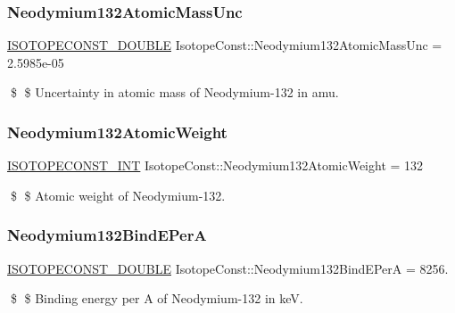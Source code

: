 \subsubsection{\texorpdfstring{Neodymium132\+Atomic\+Mass\+Unc}{Neodymium132AtomicMassUnc}}
{\footnotesize\ttfamily \mbox{\hyperlink{group___isotope_const-_macros_ga8f45a7272ce02c0b4c65c44636ed719a}{I\+S\+O\+T\+O\+P\+E\+C\+O\+N\+S\+T\+\_\+\+D\+O\+U\+B\+LE}} Isotope\+Const\+::\+Neodymium132\+Atomic\+Mass\+Unc = 2.\+5985e-\/05}

\$ \$ Uncertainty in atomic mass of Neodymium-\/132 in amu. \mbox{\label{group___isotope_const-_neodymium-_nd132_ga2d6ca3d63b9e0194f2586f181ee27cfa}} 
\subsubsection{\texorpdfstring{Neodymium132\+Atomic\+Weight}{Neodymium132AtomicWeight}}
{\footnotesize\ttfamily \mbox{\hyperlink{group___isotope_const-_macros_ga5f18360b3e99483a35c32d789e62621c}{I\+S\+O\+T\+O\+P\+E\+C\+O\+N\+S\+T\+\_\+\+I\+NT}} Isotope\+Const\+::\+Neodymium132\+Atomic\+Weight = 132}

\$ \$ Atomic weight of Neodymium-\/132. \mbox{\label{group___isotope_const-_neodymium-_nd132_ga56a9e6ac16a8c8f5df2209aacb747441}} 
\subsubsection{\texorpdfstring{Neodymium132\+Bind\+E\+PerA}{Neodymium132BindEPerA}}
{\footnotesize\ttfamily \mbox{\hyperlink{group___isotope_const-_macros_ga8f45a7272ce02c0b4c65c44636ed719a}{I\+S\+O\+T\+O\+P\+E\+C\+O\+N\+S\+T\+\_\+\+D\+O\+U\+B\+LE}} Isotope\+Const\+::\+Neodymium132\+Bind\+E\+PerA = 8256.}

\$ \$ Binding energy per A of Neodymium-\/132 in keV. \mbox{\label{group___isotope_const-_neodymium-_nd132_gaf9f705406e0d38f27f51f1116a0bfd44}} 
